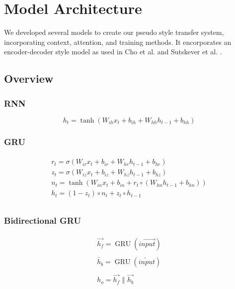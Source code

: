 \documentclass[twoside,twocolumn]{article}
\begin{document}
\section{Model Architecture}
\label{sec:models}
We developed several models to create our pseudo style transfer system,
incorporating context, attention, and training methods. It encorporates
an encoder-decoder style model as used in Cho et al. \cite{cho2014learning}
and Sutskever et al. \cite{sutskever2014sequence}.
\subsection{Overview}
\subsubsection{RNN}
\begin{equation}
  \label{eq:rnn}
  h_t = \tanh(W_{ih} x_t + b_{ih}  +  W_{hh} h_{t-1} + b_{hh})
\end{equation}
\subsubsection{GRU}
\begin{equation}
  \label{eq:gru}
  \begin{split}\begin{array}{ll}
    r_t = \sigma(W_{ir} x_t + b_{ir} + W_{hr} h_{t-1} + b_{hr}) \\
    z_t = \sigma(W_{iz} x_t + b_{iz} + W_{hz} h_{t-1} + b_{hz}) \\
    n_t = \tanh(W_{in} x_t + b_{in} + r_t \circ (W_{hn} h_{t-1}+ b_{hn})) \\
    h_t = (1 - z_t) \circ n_t + z_t \circ h_{t-1} \\
  \end{array}\end{split}
\end{equation}
\subsubsection{Bidirectional GRU}
\begin{equation}
  \label{eq:bidirectional}
  \begin{split}
    \begin{array}{ll}
      \overrightarrow{h_f} = \operatorname{GRU}(\overrightarrow{input})\\
      \\
      \overleftarrow{h_b} = \operatorname{GRU}(\overleftarrow{input})\\
      \\
      h_o = \overrightarrow{h_f} \,\,\Vert \,\, \overrightarrow{h_b}\\
    \end{array}
  \end{split}
\end{equation}
\end{document}
